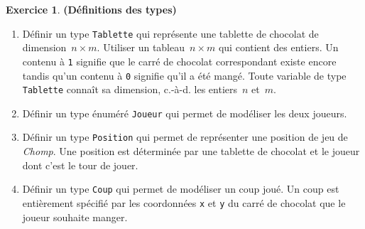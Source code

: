 \documentclass[12pt]{article}
\theoremstyle{definition}
\newtheorem{Exercice}{Exercice}
\begin{document}
\begin{Exercice} {\bf (Définitions des types)}\smallskip
\label{ex:1}

    \begin{enumerate}
        \item Définir un type {\tt Tablette} qui représente une tablette de
        chocolat de dimension~$n \times m$. Utiliser un tableau~$n \times m$
        qui contient des entiers. Un contenu à {\tt 1} signifie que le 
        carré de chocolat correspondant existe encore tandis qu'un contenu
        à {\tt 0} signifie qu'il a été mangé. Toute variable de type
        {\tt Tablette} connaît sa dimension, c.-à-d. les entiers~$n$
        et~$m$.
        \smallskip

        \item Définir un type énuméré {\tt Joueur} qui permet de modéliser
        les deux joueurs.
        \smallskip

        \item Définir un type {\tt Position} qui permet de représenter 
        une position de jeu de {\em Chomp}. Une position est déterminée 
        par une tablette de chocolat et le joueur dont c'est le tour de 
        jouer.
        \smallskip

        \item Définir un type {\tt Coup} qui permet de modéliser un coup 
        joué. Un coup est entièrement spécifié par les coordonnées {\tt x} 
        et {\tt y} du carré de chocolat que le joueur souhaite manger.
    \end{enumerate}
\end{Exercice}
\bigskip
\end{document}
